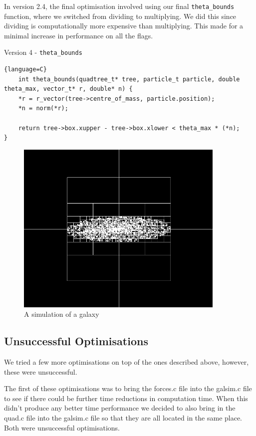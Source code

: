 In version 2.4, the final optimisation involved using our final \verb|theta_bounds| function, where we switched from dividing to multiplying. We did this since dividing is computationally more expensive than multiplying. This made for a minimal increase in performance on all the flags.
\begin{center}
    Version 4 - \verb|theta_bounds|
\end{center}
\begin{lstlisting}{language=C}
    int theta_bounds(quadtree_t* tree, particle_t particle, double theta_max, vector_t* r, double* n) {
    *r = r_vector(tree->centre_of_mass, particle.position);
    *n = norm(*r);

    return tree->box.xupper - tree->box.xlower < theta_max * (*n);
}
\end{lstlisting}
\begin{figure}[htb]
    \begin{center}
        \includegraphics[width = 10cm]{../images/squarespace.png}
        \caption{A simulation of a galaxy}
    \end{center}
\end{figure}
\newpage
\subsection{Unsuccessful Optimisations}
We tried a few more optimisations on top of the ones described above, however, these were unsuccessful.

The first of these optimisations was to bring the forces.c file into the galsim.c file to see if there could be further time reductions in computation time. When this didn't produce any better time performance we decided to also bring in the quad.c file into the galsim.c file so that they are all located in the same place. Both were unsuccessful optimisations.
